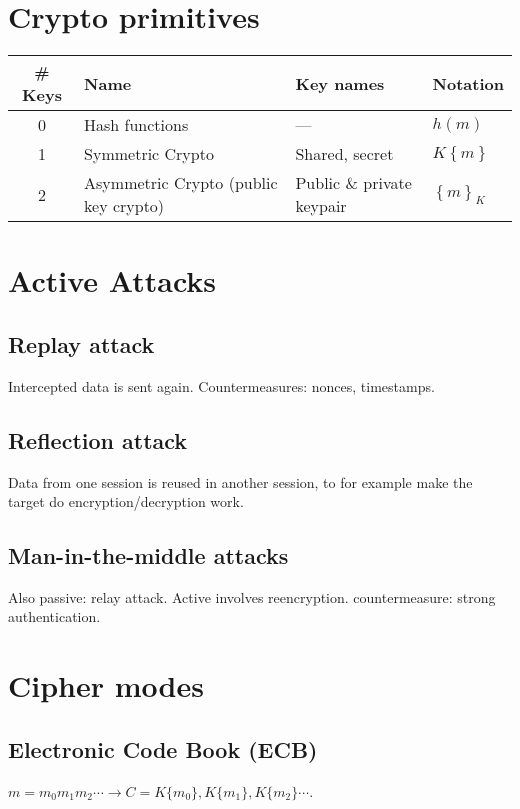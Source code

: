 \documentclass{article}
\begin{document}
\section{Crypto primitives}

\begin{tabular}[h]{c||p{100pt}|l|l}
  \bf \# Keys & \bf Name & \bf Key names & \bf Notation \\ \hline \hline
  0 & Hash functions & --- & $h(m)$ \\ \hline
  1 & Symmetric Crypto & Shared, secret & $K\left\{ m \right\}$  \\\hline
  2 & Asymmetric Crypto (public key crypto) & Public \& private keypair & $\left\{ m \right\}_K$ \\
\end{tabular}

\section{Active Attacks}

\subsection{Replay attack}

Intercepted data is sent again. Countermeasures: nonces, timestamps.

\subsection{Reflection attack}

Data from one session is reused in another session, to for example make the
target do encryption/decryption work.

\subsection{Man-in-the-middle attacks}

Also passive: relay attack. Active involves reencryption. countermeasure:
strong authentication.

\section{Cipher modes}

\subsection{Electronic Code Book (ECB)}
$m = m_0m_1m_2\cdots \rightarrow C = K\{m_0\},K\{m_1\},K\{m_2\}\cdots$.
\end{document}
